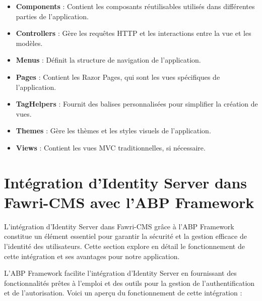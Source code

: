 \begin{itemize}
    
 \item \textbf{Components} : Contient les composants réutilisables utilisés dans différentes parties de l'application.

 \item \textbf{Controllers} : Gère les requêtes HTTP et les interactions entre la vue et les modèles.

 \item \textbf{Menus} : Définit la structure de navigation de l'application.

 \item \textbf{Pages} : Contient les Razor Pages, qui sont les vues spécifiques de l'application.

 \item \textbf{TagHelpers} : Fournit des balises personnalisées pour simplifier la création de vues.

 \item \textbf{Themes} : Gère les thèmes et les styles visuels de l'application.

 \item \textbf{Views} : Contient les vues MVC traditionnelles, si nécessaire.

\end{itemize}




\section{Intégration d'Identity Server dans Fawri-CMS avec l'ABP Framework}

\hspace{\parindent}L'intégration d'Identity Server dans Fawri-CMS grâce à l'ABP Framework constitue un élément essentiel pour garantir la sécurité et la gestion efficace de l'identité des utilisateurs. Cette section explore en détail le fonctionnement de cette intégration et ses avantages pour notre application.

L'ABP Framework facilite l'intégration d'Identity Server en fournissant des fonctionnalités prêtes à l'emploi et des outils pour la gestion de l'authentification et de l'autorisation. Voici un aperçu du fonctionnement de cette intégration :

